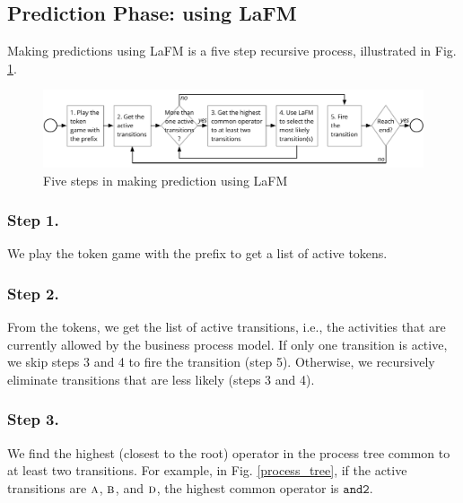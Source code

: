 \documentclass[runningheads]{llncs}
\begin{document}
\subsection{Prediction Phase: using LaFM} \label{Section:predictionPhase}

Making predictions using LaFM is a five step recursive process, illustrated in Fig. \ref{fig:predictionAbstract}.  

\begin{figure}
\begin{center}
\includegraphics[width=1\columnwidth]{02-schema/predictionAbstract.pdf}
\caption{Five steps in making prediction using LaFM}
\label{fig:predictionAbstract}
\end{center}
\end{figure} 


\subsubsection{Step 1.} We play the token game with the prefix to get a list of active tokens. 

\subsubsection{Step 2.} From the tokens, we get the list of active transitions, i.e., the activities that are currently allowed by the business process model. If only one transition is active, we skip steps 3 and 4 to fire the transition (step 5). Otherwise, we recursively eliminate transitions that are less likely (steps 3 and 4). 

\subsubsection{Step 3.} We find the highest (closest to the root) operator in the process tree common to at least two transitions. For example, in Fig. \ref{process_tree}, if the active transitions are $\textsc{a}$, $\textsc{b}$, and $\textsc{d}$, the highest common operator is $\texttt{and2}$.
\end{document}
